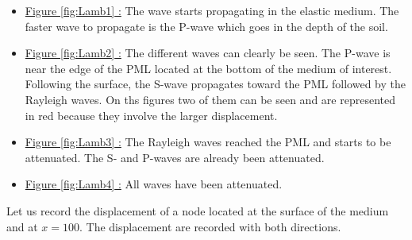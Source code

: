 \begin{itemize}
\item \underline{Figure \ref{fig:Lamb1} :} The wave starts propagating in the elastic medium. The faster wave to propagate is the P-wave which goes in the depth of the soil. 
\item \underline{Figure \ref{fig:Lamb2} :} The different waves can clearly be seen. The P-wave is near the edge of the PML located at the bottom of the medium of interest. Following the surface, the S-wave propagates toward the PML followed by the Rayleigh waves. On ths figures two of them can be seen and are represented in red because they involve the larger displacement.
\item \underline{Figure \ref{fig:Lamb3} :} The Rayleigh waves reached the PML and starts to be attenuated. The S- and P-waves are already been attenuated.
\item \underline{Figure \ref{fig:Lamb4} :} All waves have been attenuated.
\end{itemize}
Let us record the displacement of a node located at the surface of the medium and at $x=100$. The displacement are recorded with both directions.
